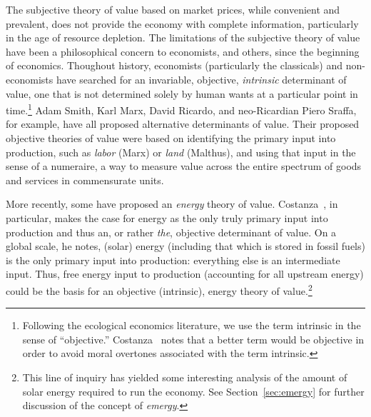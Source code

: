 The subjective theory of value based on market prices,
while convenient and prevalent, does not
provide the economy with complete
 information, particularly in the age of resource depletion. The
limitations of the subjective theory of value
have been a philosophical concern to 
economists, and others, since the beginning of economics.
Thoughout history, economists (particularly the classicals) 
and non-economists have searched for an invariable, objective, 
\emph{intrinsic} determinant of value, one that is not determined solely by human wants at a particular point in time.\footnote{Following the ecological economics literature, 
	we use the term intrinsic in the sense of ``objective.'' Costanza~\cite{Costanza:2004we} 
	notes that a better term would be objective in order to avoid moral overtones associated 
	with the term intrinsic.} 
Adam Smith, Karl Marx, David Ricardo, and neo-Ricardian Piero Sraffa,
for example, have all proposed 
alternative determinants of value.  
Their proposed objective theories of value were based 
on identifying the primary input into production,
such as \emph{labor} (Marx) or \emph{land} (Malthus), 
and using that input in the sense of a numeraire, 
a way to measure value across the entire spectrum 
of goods and services in commensurate units.

More recently, some have proposed an \emph{energy} theory of value. Costanza~\cite{Costanza:2004we}, in particular, makes the case for energy 
as the only truly primary input into production 
and thus an, or rather \emph{the}, objective determinant of value. 
On a global scale, he notes, (solar) energy 
(including that which is stored in fossil fuels) is 
the only primary input into production:
everything else is an intermediate input. 
Thus, free energy input to production (accounting for all upstream energy)
could be the basis for an objective (intrinsic), 
energy theory of value.\footnote{This line 
	of inquiry has yielded some interesting analysis of the amount 
	of solar energy required to run the economy. 
	See Section~\ref{sec:emergy} for further discussion of the concept of \emph{emergy}.}

